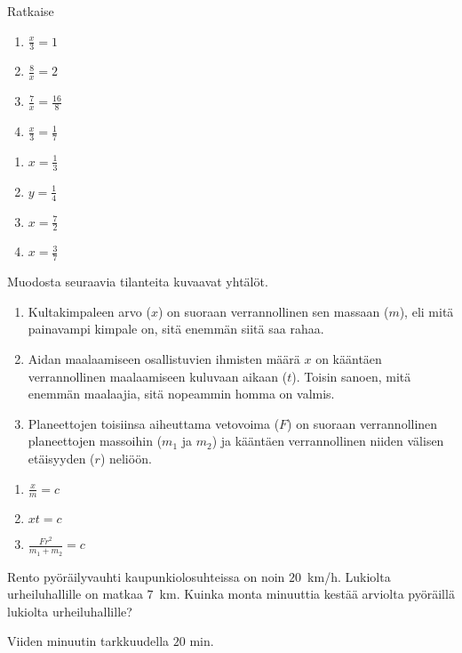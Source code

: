 \begin{tehtava}
Ratkaise
\begin{enumerate}
\item $ \frac{x}{3} = 1$
\item $ \frac{8}{x} = 2$
\item $ \frac{7}{x} = \frac{16}{8}$
\item $ \frac{x}{3} = \frac{1}{7}$
\end{enumerate}
\begin{vastaus}
\begin{enumerate}
\item $x= \frac{1}{3}$
\item $y= \frac{1}{4}$
\item $x= \frac{7}{2}$
\item $x= \frac{3}{7}$
\end{enumerate}
\end{vastaus}
\end{tehtava}

\begin{tehtava}
Muodosta seuraavia tilanteita kuvaavat yhtälöt. 
\begin{enumerate}
\item Kultakimpaleen arvo ($x$) on suoraan verrannollinen sen massaan ($m$),
eli mitä painavampi kimpale on, sitä enemmän siitä saa rahaa.
\item Aidan maalaamiseen osallistuvien ihmisten määrä {$x$} on kääntäen verrannollinen maalaamiseen kuluvaan aikaan ($t$). Toisin sanoen, mitä
enemmän maalaajia, sitä nopeammin homma on valmis.
\item Planeettojen toisiinsa aiheuttama vetovoima ($F$) on suoraan verrannollinen planeettojen massoihin ($m_1$ ja $m_2$) ja kääntäen verrannollinen niiden välisen etäisyyden ($r$) neliöön.
\end{enumerate}
\begin{vastaus}
\begin{enumerate}
\item $ \frac{x}{m}=c$
\item $ xt=c $
\item $ \frac{Fr^2}{m_1+m_2}=c$
\end{enumerate}
\end{vastaus}
\end{tehtava}

\begin{tehtava}
Rento pyöräilyvauhti kaupunkiolosuhteissa on noin $20$~km/h. Lukiolta urheiluhallille on matkaa $7$~km. Kuinka monta minuuttia kestää arviolta pyöräillä lukiolta urheiluhallille?
\begin{vastaus}
Viiden minuutin tarkkuudella $20$ min.
\end{vastaus}
\end{tehtava}


